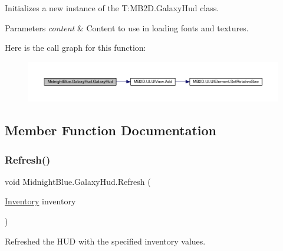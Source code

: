 Initializes a new instance of the T\+:\+M\+B2\+D.\+Galaxy\+Hud class. 


\begin{DoxyParams}{Parameters}
{\em content} & Content to use in loading fonts and textures.\\
\hline
\end{DoxyParams}
Here is the call graph for this function\+:\nopagebreak
\begin{figure}[H]
\begin{center}
\leavevmode
\includegraphics[width=350pt]{class_midnight_blue_1_1_galaxy_hud_a6f15257e5bc5bbc67cac3888f075ea29_cgraph}
\end{center}
\end{figure}


\subsection{Member Function Documentation}
\hypertarget{class_midnight_blue_1_1_galaxy_hud_aea2d04b212188a2e729ea327b7da0449}{}\label{class_midnight_blue_1_1_galaxy_hud_aea2d04b212188a2e729ea327b7da0449} 
\subsubsection{\texorpdfstring{Refresh()}{Refresh()}}
{\footnotesize\ttfamily void Midnight\+Blue.\+Galaxy\+Hud.\+Refresh (\begin{DoxyParamCaption}\item[{\hyperlink{class_m_b2_d_1_1_entity_component_1_1_inventory}{Inventory}}]{inventory }\end{DoxyParamCaption})\hspace{0.3cm}{\ttfamily [inline]}}



Refreshed the H\+UD with the specified inventory values. 


